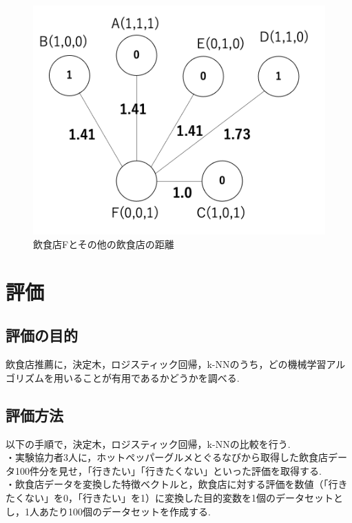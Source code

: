 \documentclass[12pt,a4j]{jreport}
\begin{document}
\vspace{5mm}

\begin{figure}[htbp]
  \begin{center}
    \includegraphics[width=12cm]{fig3.png}
    \caption{飲食店Fとその他の飲食店の距離}
    \label{fig3}
  \end{center}
\end{figure}


\chapter{評価}
\section{評価の目的}
飲食店推薦に，決定木，ロジスティック回帰，k-NNのうち，どの機械学習アルゴリズムを用いることが有用であるかどうかを調べる.

\section{評価方法}
以下の手順で，決定木，ロジスティック回帰，k-NNの比較を行う.\\

・実験協力者3人に，ホットペッパーグルメとぐるなびから取得した飲食店データ100件分を見せ，「行きたい」「行きたくない」といった評価を取得する.\\

・飲食店データを変換した特徴ベクトルと，飲食店に対する評価を数値（「行きたくない」を0，「行きたい」を1）に変換した目的変数を1個のデータセットとし，1人あたり100個のデータセットを作成する.\\
\end{document}
